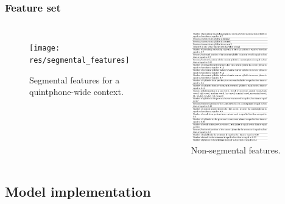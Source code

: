 \documentclass[a4paper,9pt]{beamer}
\theoremstyle{mytheoremstyle}
\begin{document}
\begin{frame}
\frametitle{Feature set}
\begin{columns}
\begin{figure}
\begin{center}
  \texttt{[image: res/segmental\_features]}
\end{center}
\caption{Segmental features for a quintphone-wide context.}
\end{figure}
\begin{figure}
\begin{center}
  \includegraphics[width=0.8\textwidth]{res/suprasegmental_features}
\end{center}
\caption{Non-segmental features.}
\end{figure}
\end{columns}
\end{frame}

\subsection{Model implementation}
\end{document}
